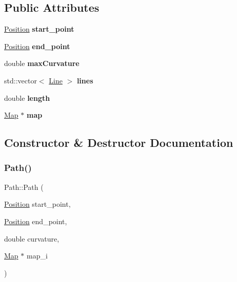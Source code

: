 \subsection*{Public Attributes}
\begin{DoxyCompactItemize}
\item 
\mbox{\label{class_path_a822c83d45ed5e336376a813c806ff66b}} 
\mbox{\hyperlink{class_position}{Position}} {\bfseries start\+\_\+point}
\item 
\mbox{\label{class_path_ab97cd4eb2fa1141118bd561c824b27cc}} 
\mbox{\hyperlink{class_position}{Position}} {\bfseries end\+\_\+point}
\item 
\mbox{\label{class_path_a181a2058e947c22fc3e25a361bb934e6}} 
double {\bfseries max\+Curvature}
\item 
\mbox{\label{class_path_a3d38eb2e010fbf82837e7d3eb5f0faba}} 
std\+::vector$<$ \mbox{\hyperlink{class_line}{Line}} $>$ {\bfseries lines}
\item 
\mbox{\label{class_path_a8ca4f648459940bdd347e52f07676473}} 
double {\bfseries length}
\item 
\mbox{\label{class_path_a13645419b6b5876ce59368184742b8d7}} 
\mbox{\hyperlink{class_map}{Map}} $\ast$ {\bfseries map}
\end{DoxyCompactItemize}


\subsection{Constructor \& Destructor Documentation}
\mbox{\label{class_path_a6abfa12b45ae127daa7408571b62b74d}} 
\subsubsection{\texorpdfstring{Path()}{Path()}}
{\footnotesize\ttfamily Path\+::\+Path (\begin{DoxyParamCaption}\item[{\mbox{\hyperlink{class_position}{Position}}}]{start\+\_\+point,  }\item[{\mbox{\hyperlink{class_position}{Position}}}]{end\+\_\+point,  }\item[{double}]{curvature,  }\item[{\mbox{\hyperlink{class_map}{Map}} $\ast$}]{map\+\_\+i }\end{DoxyParamCaption})}



